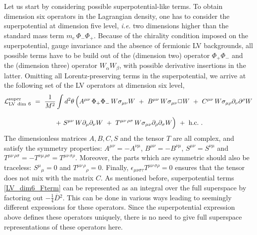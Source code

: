 \documentclass[12pt]{revtex4}
\begin{document}
Let us start by considering possible superpotential-like terms. 
To obtain dimension six operators in the Lagrangian density, 
one has to consider the superpotential at dimension five level, 
{\em i.e.} two dimensions higher than the standard mass term $m_e\,
\Phi_-\Phi_+$. Because of the chirality condition imposed on the
superpotential, gauge invariance and the absence of 
fermionic LV backgrounds,  all possible terms have to be build out of the
(dimension two) operator $\Phi_+ \Phi_-$ and the (dimension three)
operator $W_\alpha W_\beta$, with possible derivative insertions in  
the latter. Omitting all Lorentz-preserving terms in the
superpotential, we arrive at the following set of the LV operators at
dimension six level,  
%
\begin{gather} 
{\cal L}_{\rm{LV\ dim\ 6}}^{\rm{super}} ~=~ \frac{1}{M^2}
\int d^2 \theta \, \Big( 
A^{\mu\nu} \, \Phi_+ \Phi_-\, W \sigma_{\mu\nu} W ~+~ 
B^{\mu\nu} \, W \sigma_{\mu\nu} \Box W ~+~ 
C^{\mu\nu} \, W \sigma_{\mu\rho} \partial_\nu \partial^\rho W 
\nonumber \\[2ex]
~+~ 
S^{\mu\nu}\, W \partial_\mu \partial_\nu W ~+~ 
T^{\mu\nu\, \rho\sigma} \, 
W \sigma_{\mu\nu} \partial_\rho \partial_\sigma W 
\Big) ~+~ \text{h.c.}~. 
\label{LV_dim6_Fterm}
\end{gather}
%
The dimensionless matrices $A, B, C, S$ and the tensor $T$ are all complex,
and satisfy the symmetry properties: $A^{\mu\nu} = -A^{\nu\mu}$, 
$B^{\mu\nu} = -B^{\nu\mu}$, 
$S^{\mu\nu} =S^{\nu\mu}$ and 
$T^{\mu\nu\, \rho\sigma} = -T^{\nu\mu\, \rho\sigma} = 
T^{\mu\nu\, \sigma\rho}$. Moreover, the parts which are symmetric
should also be traceless: $S^\mu{}_\mu=0$ and 
$T^{\mu\nu\, \rho}{}_\rho = 0$. Finally,  
$\epsilon_{\mu\nu\sigma\tau}T^{\mu\nu\, \sigma\rho} = 0$ ensures that
the tensor does not mix with the matrix $C$. As mentioned before,
superpotential terms \eqref{LV_dim6_Fterm} can be represented as an
integral over the full superspace by factoring out $-\frac 14
\overline{D}{}^2$. This can be done in various ways leading to
seemingly different expressions for these operators. Since the
superpotential expression above defines these operators uniquely,
there is no need to give full superspace representations of 
these operators here. 
\end{document}
